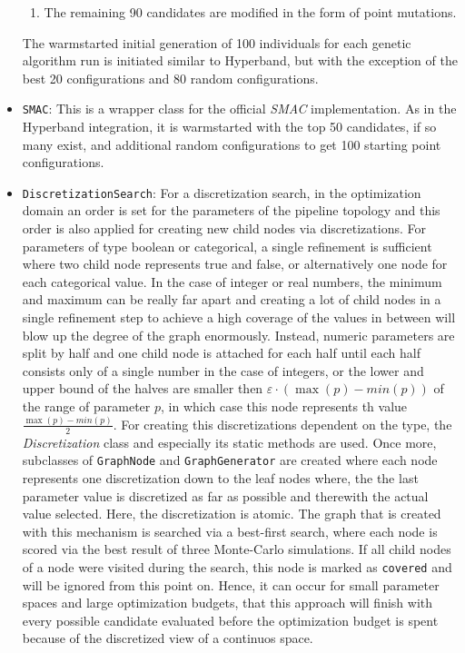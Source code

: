 \begin{itemize}
\begin{enumerate}
            \item The remaining 90 candidates are modified in the form of point mutations.
        \end{enumerate}
    The warmstarted initial generation of 100 individuals for each genetic algorithm run is initiated similar to Hyperband, but with the exception of the best 20 configurations and 80 random configurations.
    \item \texttt{SMAC}: This is a wrapper class for the official \textit{SMAC} implementation.
    As in the Hyperband integration, it is warmstarted with the top 50 candidates, if so many exist, and additional random configurations to get 100 starting point configurations.
    \item \texttt{DiscretizationSearch}: For a discretization search, in the optimization domain an order is set for the parameters of the pipeline topology and this order is also applied for creating new child nodes via discretizations.\newline
    For parameters of type boolean or categorical, a single refinement is sufficient where two child node represents true and false, or alternatively one node for each categorical value.
    In the case of integer or real numbers, the minimum and maximum can be really far apart and creating a lot of child nodes in a single refinement step to achieve a high coverage of the values in between will blow up the degree of the graph enormously.
    Instead, numeric parameters are split by half and one child node is attached for each half until each half consists only of a single number in the case of integers, or the lower and upper bound of the halves are smaller then $\varepsilon \cdot (\max(p) - min(p))$ of the range of parameter $p$, in which case this node represents th value $\frac{\max(p) - min(p)}{2}$.\newline
    For creating this discretizations dependent on the type, the \textit{Discretization} class and especially its static methods are used.
    Once more, subclasses of \texttt{GraphNode} and \texttt{GraphGenerator} are created where each node represents one discretization down to the leaf nodes where, the the last parameter value is discretized as far as possible and therewith the actual value selected. 
    Here, the discretization is atomic.\newline
    The graph that is created with this mechanism is searched via a best-first search, where each node is scored via the best result of three Monte-Carlo simulations.
    If all child nodes of a node were visited during the search, this node is marked as \texttt{covered} and will be ignored from this point on.
    Hence, it can occur for small parameter spaces and large optimization budgets, that this approach will finish with every possible candidate evaluated before the optimization budget is spent because of the discretized view of a continuos space.
\end{itemize}

